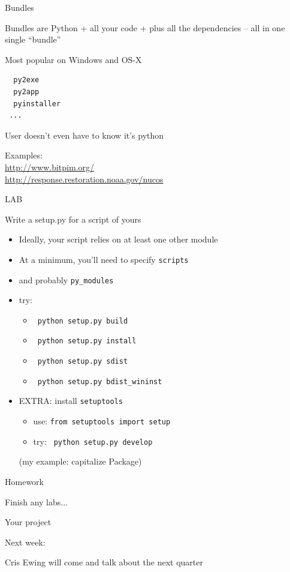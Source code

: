 \documentclass{beamer}
\begin{document}
\begin{frame}[fragile]{Bundles}

{\Large
Bundles are Python + all your code + plus all the dependencies --
all in one single ``bundle'' 

\vfill
Most popular on Windows and OS-X
}
\begin{verbatim}
  py2exe
  py2app
  pyinstaller
 ...
\end{verbatim}

{\Large User doesn't even have to know it's python }

\vfill
Examples: \\
\hspace{0.5in} \url{http://www.bitpim.org/} \\
\hspace{0.5in} \url{http://response.restoration.noaa.gov/nucos}

\end{frame} 


\begin{frame}[fragile]{LAB}

{\Large Write a setup.py for a script of yours}

\begin{itemize}
  \item Ideally, your script relies on at least one other module
  \item At a minimum, you'll need to specify \verb|scripts|
  \item and probably \verb|py_modules|
  \item try:
  \begin{itemize}
    \item \verb| python setup.py build| 
    \item \verb| python setup.py install| 
    \item \verb| python setup.py sdist| 
    \item \verb| python setup.py bdist_wininst| 
  \end{itemize}
  \item EXTRA: install \verb|setuptools|
  \begin{itemize}
    \item use: \verb|from setuptools import setup|
    \item try: \verb| python setup.py develop| 
  \end{itemize}

\vfill
(my example: capitalize Package)
\end{itemize}

\end{frame}


\begin{frame}[fragile]{Homework}

\vfill
{\LARGE Finish any labs...}

\vfill
{\LARGE Your project}

\vfill
{\LARGE Next week:}

\vfill
{\Large Cris Ewing will come and talk about the next quarter}

\vfill
\end{frame}
\end{document}
